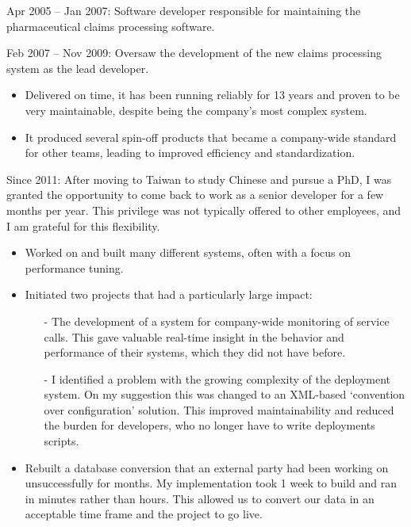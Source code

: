 \documentclass[10pt,a4paper]{../altacv}
\begin{document}
Apr 2005 -- Jan 2007: Software developer responsible for maintaining the pharmaceutical claims processing software.

\medskip

Feb 2007 -- Nov 2009: Oversaw the development of the new claims processing system as the lead developer.

\medskip

\begin{itemize}
	\item Delivered on time, it has been running reliably for 13 years and proven to be very maintainable, despite being the company's most complex system.
	\item It produced several spin-off products that became a company-wide standard for other teams, leading to improved efficiency and standardization.
\end{itemize}

\medskip

Since 2011: After moving to Taiwan to study Chinese and pursue a PhD, I was granted the opportunity to come back to work as a senior developer for a few months per year. This privilege was not typically offered to other employees, and I am grateful for this flexibility.


\medskip

\begin{itemize}
	\item Worked on and built many different systems, often with a focus on performance tuning.
	\item Initiated two projects that had a particularly large impact:
	\begin{itemize}
		\item[-] The development of a system for company-wide monitoring of service calls. This gave valuable real-time insight in the behavior and performance of their systems, which they did not have before.
		\item[-] I identified a problem with the growing complexity of the deployment system. On my suggestion this was changed to an XML-based ‘convention over configuration' solution. This improved maintainability and reduced the burden for developers, who no longer have to write deployments scripts.
	\end{itemize}
	\item Rebuilt a database conversion that an external party had been working on unsuccessfully for months. My implementation took 1 week to build and ran in minutes rather than hours. This allowed us to convert our data in an acceptable time frame and the project to go live.
\end{itemize}
\end{document}
